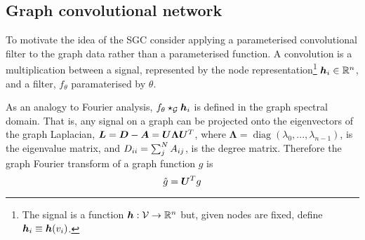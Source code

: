 





\subsection{Graph convolutional network}
\label{sec:GCN}



To motivate the idea of the SGC consider applying a parameterised convolutional filter to the graph data rather than a parameterised function. A convolution is a multiplication between a signal, represented by the node representation\footnote{The signal is a function ${\bm{h}}: {\mathcal{V}} \to \mathbb{R}^n$ but, given nodes are fixed, define ${\bm{h}}_i \equiv {\bm{h}}(v_i)$.}
${\bm{h}}_i \in \mathbb{R}^n$, and a filter, $f_\theta$ paramaterised by $\theta$.

As an analogy to Fourier analysis, $f_\theta \star_{\mathcal{G}} {\bm{h}}_i$ is defined in the graph spectral domain.
That is, any signal on a graph can be projected onto the eigenvectors of the graph Laplacian, ${\bm{L}} = {\bm{D}} - {\bm{A}} = {\bm{U}}\bm{\Lambda}{\bm{U}}^T$, where $\bm{\Lambda} = \operatorname{diag}(\lambda_0, ..., \lambda_{n-1})$, is the eigenvalue matrix, and ${D}_{ii} = \sum_j^N {A}_{ij}$, is the degree matrix.
Therefore the graph Fourier transform of a graph function $g$ is
\begin{equation}
    \hat{g} = {\bm{U}}^Tg
\end{equation}

%

